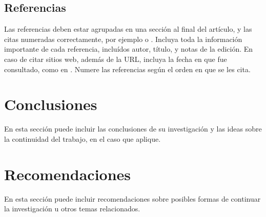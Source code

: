 \documentclass[a4paper,10pt,twocolumn]{article}
\begin{document}
	\subsection{Referencias}
  	Las referencias deben estar agrupadas en una sección al final del artículo,
  	y las citas numeradas correctamente, por ejemplo \cite{knuth} o \cite{goedel}.
  	Incluya toda la información importante de cada referencia, incluídos autor,
  	título, y notas de la edición. En caso de citar sitios web, además
  	de la URL, incluya la fecha en que fue consultado, como en \cite{wiki}. Numere 
  	las referencias según el orden en que se les cita.




\section{Conclusiones}\label{sec:conc}

  En esta sección puede incluir las conclusiones de su investigación y las ideas
  sobre la continuidad del trabajo, en el caso que aplique.




\section{Recomendaciones}\label{sec:rec}

  En esta sección puede incluir recomendaciones sobre posibles formas de continuar
  la investigación u otros temas relacionados.

\end{document}
